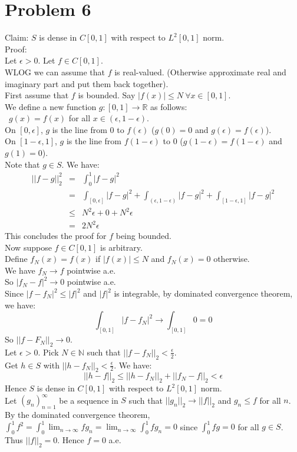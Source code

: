 \documentclass[12pt]{article}
\begin{document}
\section*{Problem 6}
Claim: $S$ is dense in $C[0,1]$ with respect to $L^2[0,1]$ norm. \\
Proof: \\
Let $\epsilon >0$. Let $f \in C[0,1]$. \\ 
WLOG we can assume that $f$ is real-valued. (Otherwise approximate real and imaginary part and put them back together).\\
First assume that $f$ is bounded. Say $|f(x)| \le N \ \forall x \in [0,1]$.\\
We define a new function $g: [0,1] \rightarrow \mathbb{R}$ as follows: \\\
$g(x)=f(x)$ for all $x \in (\epsilon,1-\epsilon)$.
\\
On $[0,\epsilon]$, $g$ is the line from $0$ to $f(\epsilon)$ ($g(0)=0$ and $g(\epsilon)=f(\epsilon)$). 
\\
On $[1-\epsilon,1]$, $g$ is the line from $f(1-\epsilon)$ to $0$ ($g(1-\epsilon)=f(1-\epsilon)$ and $g(1)=0$). \\
Note that $g \in S$. We have:
\begin{eqnarray*}
||f-g||_2^2 &=&
\int_0^1 |f-g|^2
\\ &=&
\int_{[0,\epsilon]} |f-g|^2 +
\int_{(\epsilon,1-\epsilon)} |f-g|^2 +
\int_{[1-\epsilon,1]} |f-g|^2
\\ &\le &
N^2\epsilon + 0 + N^2\epsilon
\\ &=&
2N^2\epsilon 
\end{eqnarray*}
This concludes the proof for $f$ being bounded. \\
Now suppose $f \in C[0,1]$ is arbitrary. \\
Define $f_N(x)=f(x)$ if $|f(x)| \le N$ and
$f_N(x)=0$ otherwise.\\
We have $f_N \rightarrow f$ pointwise a.e. \\
So $|f_N-f|^2 \rightarrow 0$ pointwise a.e.\\
Since $|f-f_N|^2 \le |f|^2$ and $|f|^2$ is integrable, by dominated convergence theorem, we have:
$$\int_{[0,1]} |f-f_N|^2 \rightarrow \int_{[0,1]} 0=0$$
So $||f-F_N||_2 \rightarrow 0$. \\
Let $\epsilon >0$. Pick $N \in \mathbb{N}$ such that
$||f-f_N||_2 < \frac{\epsilon}{2}$. \\
Get $h \in S$ with
$||h-f_N||_2 < \frac{\epsilon}{2}$. We have:
$$||h-f||_2 \le ||h-f_N||_2+||f_N-f||_2 < \epsilon$$
Hence $S$ is dense in $C[0,1]$ with respect to $L^2[0,1]$ norm. \\
Let $(g_n)_{n=1}^{\infty}$ be a sequence in $S$ such that $||g_n||_2 \rightarrow ||f||_2$ and $g_n \le f$ for all $n$. \\
By the dominated convergence theorem,
$\int_0^1 f^2=\int_0^1 \lim_{n \rightarrow \infty} fg_n
=\lim_{n \rightarrow \infty} \int_0^1 fg_n=0$ since $\int_0^1 fg=0$ for all $g \in S$. \\
Thus $||f||_2 =0$. Hence $f=0$ a.e.
\end{document}
